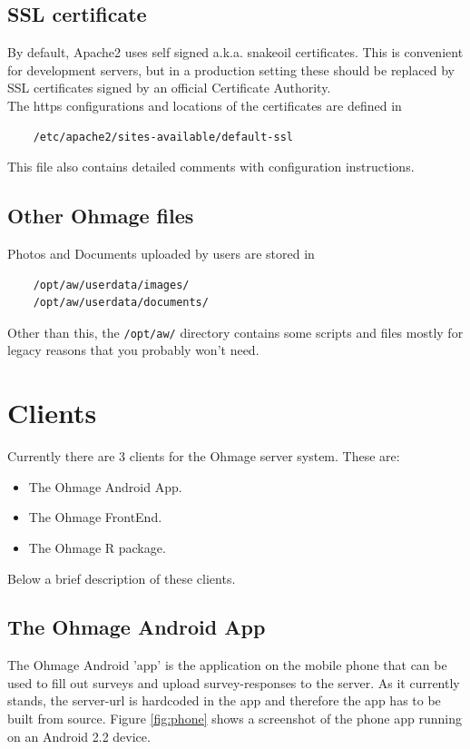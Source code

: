 \documentclass{scrartcl}
\begin{document}
\subsection{SSL certificate}

By default, Apache2 uses self signed a.k.a. snakeoil certificates. This is
convenient for development servers, but in a production setting these
should be replaced by SSL certificates signed by an official Certificate Authority. \\

\noindent The https configurations and locations of the certificates are defined
in

\begin{verbatim}
    /etc/apache2/sites-available/default-ssl
\end{verbatim}
This file also contains detailed comments with configuration instructions.

\subsection{Other Ohmage files}

Photos and Documents uploaded by users are stored in

\begin{verbatim}
    /opt/aw/userdata/images/
    /opt/aw/userdata/documents/
\end{verbatim}
Other than this, the \texttt{/opt/aw/} directory contains some scripts and files
mostly for legacy reasons that you probably won't need.

\section{Clients}

Currently there are 3 clients for the Ohmage server system. These are:

\begin{itemize}
  \item The Ohmage Android App.
  \item The Ohmage FrontEnd.
  \item The Ohmage R package.
\end{itemize}
Below a brief description of these clients.

\subsection{The Ohmage Android App}

The Ohmage Android 'app' is the application on the mobile phone that can be used
to fill out surveys and upload survey-responses to the server. As it currently
stands, the server-url is hardcoded in the app and therefore the app has to be
built from source. Figure \ref{fig:phone} shows a screenshot of the phone app running on
an Android 2.2 device. \\
\end{document}
